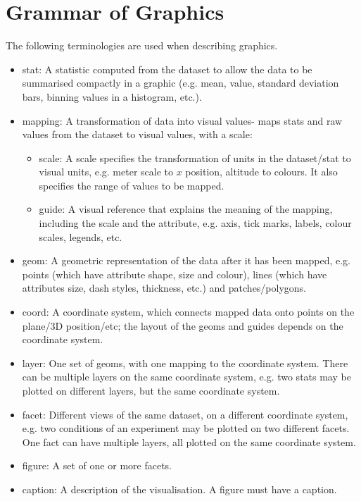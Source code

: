 \documentclass[a4paper, openany]{memoir}
\begin{document}
\section{Grammar of Graphics}
The following terminologies are used when describing graphics.
\begin{itemize}
    \item stat: A statistic computed from the dataset to allow the data to be summarised compactly in a graphic (e.g. mean, value, standard deviation bars, binning values in a histogram, etc.).
    
    \item mapping: A transformation of data into visual values- maps stats and raw values from the dataset to visual values, with a scale:
    \begin{itemize}
        \item scale: A scale specifies the transformation of units in the dataset/stat to visual units, e.g. meter scale to $x$ position, altitude to colours. It also specifies the range of values to be mapped.
        \item guide: A visual reference that explains the meaning of the mapping, including the scale and the attribute, e.g. axis, tick marks, labels, colour scales, legends, etc.
    \end{itemize}

    \item geom: A geometric representation of the data after it has been mapped, e.g. points (which have attribute shape, size and colour), lines (which have attributes size, dash styles, thickness, etc.) and patches/polygons.
    
    \item coord: A coordinate system, which connects mapped data onto points on the plane/3D position/etc; the layout of the geoms and guides depends on the coordinate system.
    
    \item layer: One set of geoms, with one mapping to the coordinate system. There can be multiple layers on the same coordinate system, e.g. two stats may be plotted on different layers, but the same coordinate system.
    
    \item facet: Different views of the same dataset, on a different coordinate system, e.g. two conditions of an experiment may be plotted on two different facets. One fact can have multiple layers, all plotted on the same coordinate system.
    
    \item figure: A set of one or more facets.
    
    \item caption: A description of the visualisation. A figure must have a caption.
\end{itemize}
\end{document}
